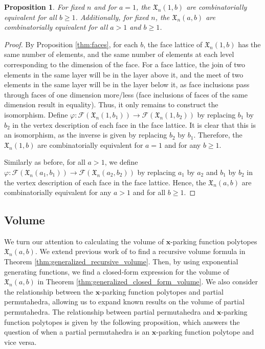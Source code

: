 \documentclass[11pt]{amsart}
\newtheorem{proposition}[theorem]{Proposition}
\theoremstyle{definition}
\newcommand{\0}{\emptyset}
\newcommand{\bx}{\mathbf{x}}
\newcommand{\Xn}{\mathfrak{X}_{n}(a,b)}
\begin{document}
\begin{proposition}
 For fixed $n$ and for $a=1$, the $\mathfrak{X}_{n}(1,b)$ are combinatorially equivalent for all $b \geq 1$.
Additionally, for fixed $n$, the $\Xn$ are combinatorially equivalent for all $a > 1$ and $b \geq 1$.
\end{proposition}

\begin{proof}
By Proposition \ref{thm:faces}, for each $b$, the face lattice of $\mathfrak{X}_{n}(1,b)$ has the same number of elements, and the same number of elements at each level corresponding to the dimension of the face.
For a face lattice, the join of two elements in the same layer will be in the layer above it, and the meet of two elements in the same layer will be in the layer below it, as face inclusions pass through faces of one dimension more/less (face inclusions of faces of the same dimension result in equality).
Thus, it only remains to construct the isomorphism.
Define $\varphi: \mathcal{F}(\mathfrak{X}_{n}(1,b_1)) \to \mathcal{F}(\mathfrak{X}_{n}(1,b_2))$ by replacing $b_1$ by $b_2$ in the vertex description of each face in the face lattice.
It is clear that this is an isomorphism, as the inverse is given by replacing $b_2$ by $b_1$.
Therefore, the $\mathfrak{X}_{n}(1,b)$ are combinatorially equivalent for $a=1$ and for any $b\geq 1$. 

Similarly as before, for all $a>1$, we define $\varphi: \mathcal{F}(\mathfrak{X}_{n}(a_1,b_1)) \to \mathcal{F}(\mathfrak{X}_{n}(a_2,b_2))$ by replacing $a_1$ by $a_2$ and $b_1$ by $b_2$ in the vertex description of each face in the face lattice.
Hence, the $\Xn$ are combinatorially equivalent for any $a>1$ and for all $b\geq 1$. 
\end{proof}


\subsection{Volume}\label{sec:volume}
We turn our attention to calculating the volume of  $\bx$-parking function polytopes $\Xn$.
We extend previous work of \cite{AW} to find a recursive volume formula in Theorem \ref{thm:generalized_recursive_volume}. 
Then, by using exponential generating functions, we find a closed-form expression for the volume of  $\Xn$ in Theorem \ref{thm:generalized_closed_form_volume}. 
We also consider the relationship between the  $\bx$-parking function polytopes and partial permutahedra, allowing us to expand known results on the volume of partial permutahedra.
The relationship between partial permutahedra and $\mathbf{x}$-parking function polytopes is given by the following proposition, which answers the question of when a partial permutahedra is an $\mathbf{x}$-parking function polytope and vice versa.
\end{document}
